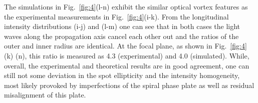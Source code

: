 \documentclass[9pt,twocolumn,twoside]{osajnl}
\begin{document}
The simulations in Fig.~\ref{fig:4}(l-n) exhibit the similar optical vortex features as the experimental measurements in Fig.~\ref{fig:4}(i-k). From the longitudinal intensity distributions (i-j) and (l-m) one can see that in both cases the light waves along the propagation axis cancel each other out and the ratios of the outer and inner radius are identical. At the focal plane, as shown in Fig.~\ref{fig:4} (k) (n), this ratio is measured as 4.3 (experimental) and 4.0 (simulated). While, overall, the experimental and theoretical results are in good agreement, one can still not some deviation in the spot ellipticity and the intensity homogeneity, most likely provoked by imperfections of the spiral phase plate as well as residual misalignment of this plate.
\end{document}
